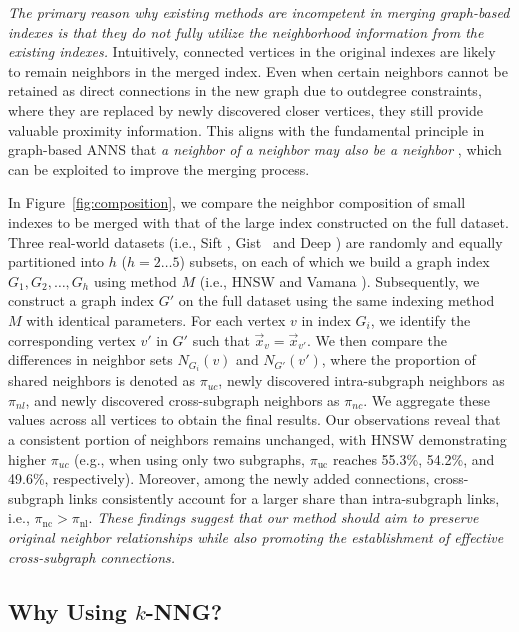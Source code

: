 \documentclass[acmsmall]{acmart}
\theoremstyle{remark}
\theoremstyle{definition}
\begin{document}
\textit{The primary reason why existing methods are incompetent in merging graph-based indexes is that they do not fully utilize the neighborhood information from the existing indexes.} Intuitively, connected vertices in the original indexes are likely to remain neighbors in the merged index. Even when certain neighbors cannot be retained as direct connections in the new graph due to outdegree constraints, where they are replaced by newly discovered closer vertices, they still provide valuable proximity information. This aligns with the fundamental principle in graph-based ANNS that \textit{a neighbor of a neighbor may also be a neighbor} \cite{dong2011efficient,li2019approximate,wang2021comprehensive}, which can be exploited to improve the merging process.

In Figure~\ref{fig:composition}, we compare the neighbor composition of small indexes to be merged with that of the large index constructed on the full dataset. Three real-world datasets (i.e., Sift \cite{jegou2010product}, Gist~\cite{jegou2010product} and Deep \cite{babenko2016efficient}) are randomly and equally partitioned into $h$ ($h = 2\ldots 5$) subsets, on each of which we build a graph index $G_1, G_2, \ldots, G_h$ using method $M$ (i.e., HNSW \cite{malkov2018efficient} and Vamana \cite{jayaram2019diskann}). Subsequently, we construct a graph index $G'$ on the full dataset using the same indexing method $M$ with identical parameters. For each vertex $v$ in index $G_i$, we identify the corresponding vertex $v'$ in $G'$ such that $\vec{x}_v = \vec{x}_{v'}$. We then compare the differences in neighbor sets $N_{G_i}(v)$ and $N_{G'}(v')$, where the proportion of shared neighbors is denoted as $\pi_{uc}$, newly discovered intra-subgraph neighbors as $\pi_{nl}$, and newly discovered cross-subgraph neighbors as $\pi_{nc}$. We aggregate these values across all vertices to obtain the final results. Our observations reveal that a consistent portion of neighbors remains unchanged, with HNSW demonstrating higher $\pi_{uc}$ (e.g., when using only two subgraphs, $\pi_{\text{uc}}$ reaches 55.3\%, 54.2\%, and 49.6\%, respectively). Moreover, among the newly added connections, cross-subgraph links consistently account for a larger share than intra-subgraph links, i.e., $\pi_{\text{nc}} > \pi_{\text{nl}}$. \textit{These findings suggest that our method should aim to preserve original neighbor relationships while also promoting the establishment of effective cross-subgraph connections.}

\subsection{Why Using $k$-NNG?}
\label{subsec:why_knng}
\end{document}
